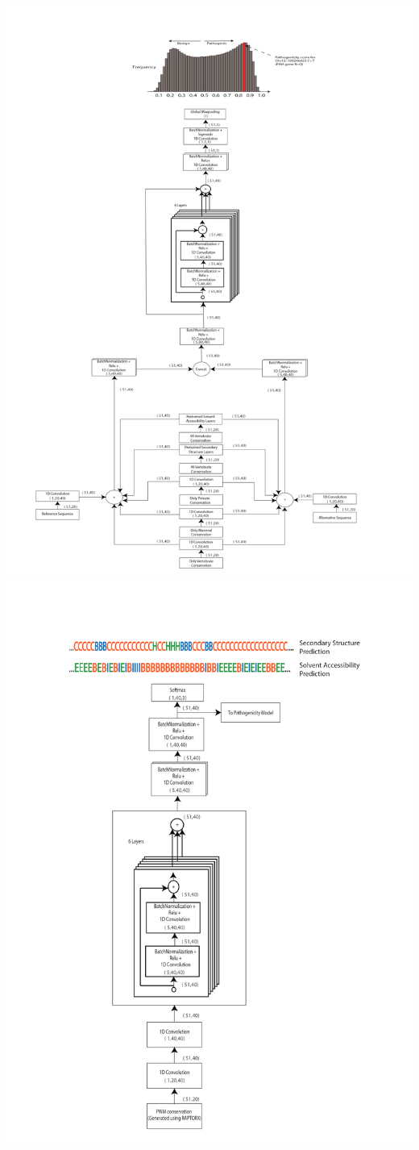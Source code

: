 \documentclass[twoside]{article}
\begin{document}
\includegraphics[scale=0.22]{Model}\\
\includegraphics[scale=0.24]{Model2}
\end{document}
